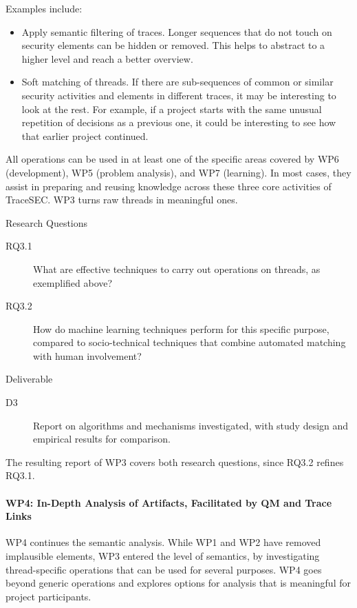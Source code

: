Examples include:
\begin{itemize}
\item Apply semantic filtering of traces. Longer sequences that do not touch on security elements can be hidden or removed. This helps to abstract to a higher level and reach a better overview. 
\item Soft matching of threads. If there are sub-sequences of common or similar security activities and elements in different traces, it may be interesting to look at the rest. For example, if a project starts with the same unusual repetition of decisions as a previous one, it could be interesting to see how that earlier project continued.
\end{itemize}

All operations can be used in at least one of the specific areas covered by WP6 (development), WP5 (problem analysis), and WP7 (learning). In most cases, they assist in preparing and reusing knowledge across these three core activities of TraceSEC. WP3 turns raw threads in meaningful ones.

Research Questions
\begin{description}
	\item[RQ3.1]	What are effective techniques to carry out operations on threads, as exemplified above?
	\item[RQ3.2]	How do machine learning techniques perform for this specific purpose, compared to socio-technical techniques that combine automated matching with human involvement?
\end{description}

Deliverable
\begin{description}
	\item[D3] Report on algorithms and mechanisms investigated, with study design and empirical results for comparison. 
\end{description}

The resulting report of WP3 covers both research questions, since RQ3.2 refines RQ3.1. 

\paragraph*{WP4: In-Depth Analysis of Artifacts, Facilitated by QM and Trace Links}
WP4 continues the semantic analysis. While WP1 and WP2 have removed implausible elements, WP3 entered the level of semantics, by investigating thread-specific operations that can be used for several purposes. WP4 goes beyond generic operations and explores options for analysis that is meaningful for project participants.

